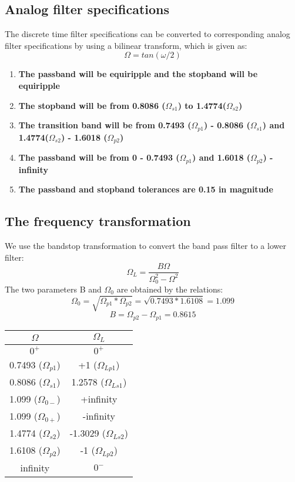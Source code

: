 \documentclass[12pt]{article}
\begin{document}
\subsection{Analog filter specifications }
The discrete time filter specifications can be converted to corresponding analog filter specifications by using a bilinear transform, which is given as:
\begin{equation}
    \Omega = tan(\omega/2)
\end{equation}
\begin{enumerate}
    \item \textbf{The passband will be equiripple and the stopband will be equiripple}
    \item \textbf{The stopband will be from 0.8086 ($\Omega_{s1}$) to 1.4774($\Omega_{s2}$)}
    \item \textbf{The transition band will be from 0.7493 ($\Omega_{p1}$) - 0.8086 ($\Omega_{s1}$) and \\1.4774($\Omega_{s2}$) - 1.6018 ($\Omega_{p2}$)}
    \item \textbf{The passband will be from 0 - 0.7493 ($\Omega_{p1}$)  and 1.6018 ($\Omega_{p2}$) - infinity} 
    \item \textbf{The passband and stopband tolerances are 0.15 in magnitude}
\end{enumerate}
\subsection{The frequency transformation }
We use the bandstop transformation to convert the band pass filter to a lower filter:
\begin{equation}
    \Omega_L=\frac{B\Omega}{\Omega_{0}^2-\Omega^2}
\end{equation}
The two parameters B and $\Omega_{0}$ are obtained by the relations:
\begin{equation}
    \Omega_{0}=\sqrt{\Omega_{p1}*\Omega_{p2}}= \sqrt{0.7493*1.6108}=1.099
    \end{equation}
    \begin{equation}   
    B=\Omega_{p2}-\Omega_{p1}=0.8615
 \end{equation}
 \begin{center}
\def\arraystretch{1.1}
\bgroup
\begin{tabular}{|c|c|}
\hline
\textbf{$\Omega$ }
& \textbf{$\Omega_L$ }\\ 
\hline \hline
$0^+$  &  $0^+$  \\ 
\hline 
0.7493 ($\Omega_{p1}$)   &   +1 ($\Omega_{Lp1}$) \\ 
\hline
0.8086 ($\Omega_{s1}$)  &   1.2578  ($\Omega_{Ls1}$)\\ 
\hline
1.099  ($\Omega_{0-}$) & +infinity  \\ 
\hline
1.099  ($\Omega_{0+}$) & -infinity  \\ 
\hline
1.4774 ($\Omega_{s2}$)   &  -1.3029 ($\Omega_{Ls2}$) \\ 
\hline
1.6108 ($\Omega_{p2}$)  &   -1 ($\Omega_{Lp2}$) \\ 
 \hline
 infinity & $0^-$ \\
 \hline
\end{tabular}
\egroup
\end{center}
\end{document}
